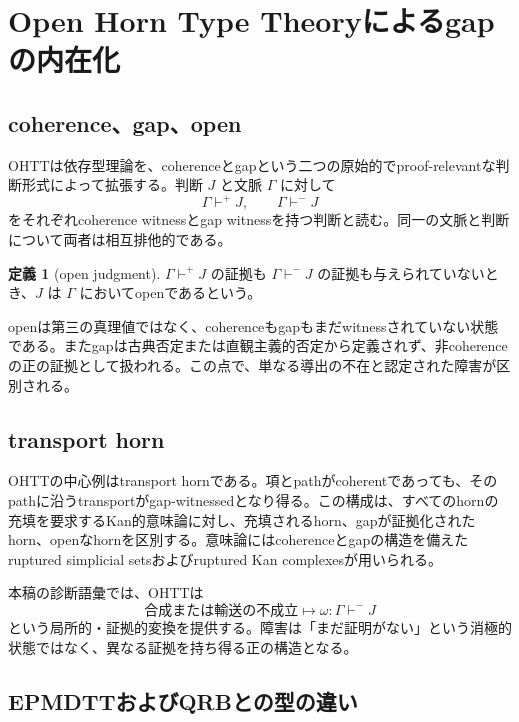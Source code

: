\documentclass[a4paper,11pt]{ltjsarticle}
\theoremstyle{definition}
\newtheorem{definition}{定義}[section]
\theoremstyle{plain}
\begin{document}
\section{Open Horn Type Theoryによるgapの内在化}

\subsection{coherence、gap、open}

OHTTは依存型理論を、coherenceとgapという二つの原始的でproof-relevantな判断形式によって拡張する\cite{Poernomo2025OHTT}。判断 $J$ と文脈 $\Gamma$ に対して
\begin{equation}
 \Gamma\vdash^{+}J,
 \qquad
 \Gamma\vdash^{-}J
 \label{eq:ohtt-polarity}
\end{equation}
をそれぞれcoherence witnessとgap witnessを持つ判断と読む。同一の文脈と判断について両者は相互排他的である。

\begin{definition}[open judgment]
$\Gamma\vdash^{+}J$ の証拠も $\Gamma\vdash^{-}J$ の証拠も与えられていないとき、$J$ は $\Gamma$ においてopenであるという。
\end{definition}

openは第三の真理値ではなく、coherenceもgapもまだwitnessされていない状態である。またgapは古典否定または直観主義的否定から定義されず、非coherenceの正の証拠として扱われる。この点で、単なる導出の不在と認定された障害が区別される。

\subsection{transport horn}

OHTTの中心例はtransport hornである。項とpathがcoherentであっても、そのpathに沿うtransportがgap-witnessedとなり得る。この構成は、すべてのhornの充填を要求するKan的意味論に対し、充填されるhorn、gapが証拠化されたhorn、openなhornを区別する。意味論にはcoherenceとgapの構造を備えたruptured simplicial setsおよびruptured Kan complexesが用いられる\cite{Poernomo2025OHTT}。

本稿の診断語彙では、OHTTは
\begin{equation}
 \text{合成または輸送の不成立}
 \longmapsto
 \omega:\Gamma\vdash^{-}J
\end{equation}
という局所的・証拠的変換を提供する。障害は「まだ証明がない」という消極的状態ではなく、異なる証拠を持ち得る正の構造となる。

\subsection{EPMDTTおよびQRBとの型の違い}
\end{document}
